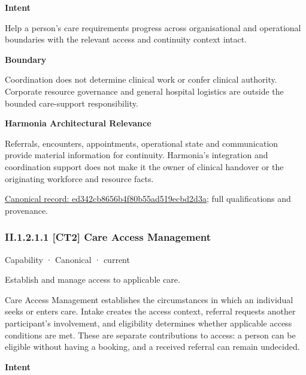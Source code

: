 \textbf{Intent}



Help a person's care requirements progress across organisational and operational boundaries with the relevant access and continuity context intact.



\textbf{Boundary}



Coordination does not determine clinical work or confer clinical authority. Corporate resource governance and general hospital logistics are outside the bounded care-support responsibility.



\textbf{Harmonia Architectural Relevance}



Referrals, encounters, appointments, operational state and communication provide material information for continuity. Harmonia's integration and coordination support does not make it the owner of clinical handover or the originating workforce and resource facts.


{\footnotesize \href{../../../../continuum/strategy/capability/ed342cb8656b4f80b55ad519ecbd2d3a.md}{Canonical record: ed342cb8656b4f80b55ad519ecbd2d3a}; full qualifications and provenance.}\par
\subsubsection*{II.1.2.1.1 [CT2] Care Access Management}
\label{navigation:II.1.2.1.1}

\label{element:acbcad8330e64b59be5e3ec4a100a544}
{\small Capability · Canonical · current}\par

Establish and manage access to applicable care.



Care Access Management establishes the circumstances in which an individual seeks or enters care. Intake creates the access context, referral requests another participant's involvement, and eligibility determines whether applicable access conditions are met. These are separate contributions to access: a person can be eligible without having a booking, and a received referral can remain undecided.



\textbf{Intent}



